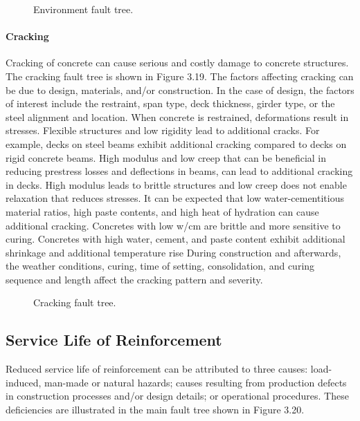 \begin{figure}
  \caption{Environment fault tree.}\label{fig:fault-tree-environment} 
\end{figure}

\paragraph{Cracking}
Cracking of concrete can cause serious and costly damage to concrete structures. The cracking fault tree is
shown in Figure 3.19. The factors affecting cracking can be due to design, materials, and/or construction. In the case
of design, the factors of interest include the restraint, span type, deck thickness, girder type, or the steel alignment
and location. When concrete is restrained, deformations result in stresses. Flexible structures and low rigidity lead to
additional cracks. For example, decks on steel beams exhibit additional cracking compared to decks on rigid
concrete beams. High modulus and low creep that can be beneficial in reducing prestress losses and deflections in
beams, can lead to additional cracking in decks. High modulus leads to brittle structures and low creep does not
enable relaxation that reduces stresses. It can be expected that low water-cementitious material ratios, high paste contents, and high heat of hydration can cause additional cracking. Concretes with low w/cm are brittle and more
sensitive to curing. Concretes with high water, cement, and paste content exhibit additional shrinkage and additional
temperature rise During construction and afterwards, the weather conditions, curing, time of setting, consolidation,
and curing sequence and length affect the cracking pattern and severity.

\begin{figure}
  \caption{Cracking fault tree.}\label{fig:fault-tree-cracking} 
\end{figure}


\subsection{Service Life of Reinforcement}
Reduced service life of reinforcement can be attributed to three causes: load-induced, man-made or natural
hazards; causes resulting from production defects in construction processes and/or design details; or operational
procedures. These deficiencies are illustrated in the main fault tree shown in Figure 3.20.

